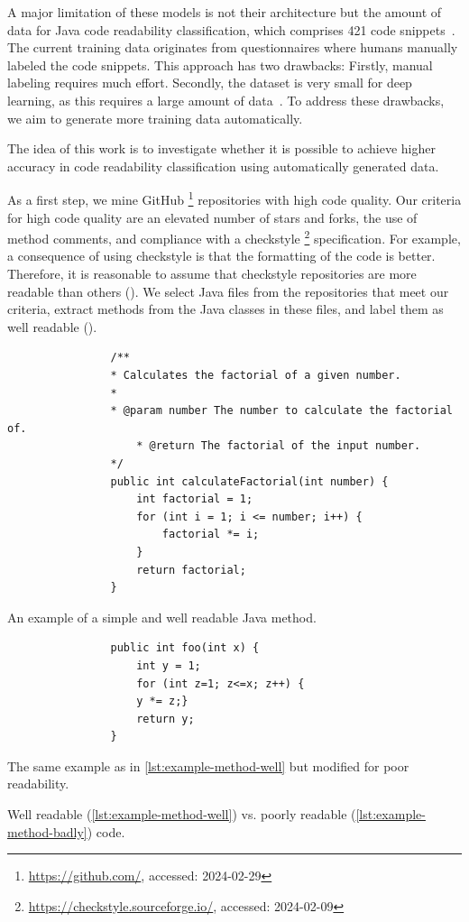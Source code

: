 \documentclass[%
class=scrreprt,
chapterprefix=false,%
open=right,%
twoside=true,%
paper=a4,%
logofile={Logo\_zentral\_farbig\_EN.png},%
thesistype=master,%
UKenglish,%
]{se2thesis}
\newcounter{urlfootnote}
\newcommand{\onecurl}[2]{%
	\stepcounter{urlfootnote}%
	\expandafter\def\csname urlfootnote:#1\endcsname{\theurlfootnote}%
	\footnote{\label{url:#1}\url{#1}, accessed: #2}%
}
\newcommand{\curl}[2]{%
		\onecurl{#1}{#2}%
}
\theoremstyle{definition}
\newcommand{\citeolddataset}{\cite{buse2009learning, dorn2012general, scalabrino2018comprehensive}\xspace}
\begin{document}
	A major limitation of these models is not their architecture but the amount of data for Java code readability classification, which comprises 421 code snippets~\citeolddataset. The current training data originates from questionnaires where humans manually labeled the code snippets. This approach has two drawbacks: Firstly, manual labeling requires much effort.
	Secondly, the dataset is very small for deep learning, as this requires a large amount of data~\cite{hestness2017deep}.
	To address these drawbacks, we aim to generate more training data automatically.
	
	The idea of this work is to investigate whether it is possible to achieve higher accuracy in code readability classification using automatically generated data. 
	
	As a first step, we mine GitHub\curl{https://github.com/}{2024-02-29} repositories with high code quality.
	Our criteria for high code quality are an elevated number of stars and forks, the use of method comments, and compliance with a checkstyle\curl{https://checkstyle.sourceforge.io/}{2024-02-09} specification. For example, a consequence of using checkstyle is that the formatting of the code is better. Therefore, it is reasonable to assume that  checkstyle repositories are more readable than others ().
	We select Java files from the repositories that meet our criteria, extract methods from the Java classes in these files, and label them as well readable ().
	
	\begin{listing}[tb]
		\begin{sublisting}{\linewidth}
			\begin{verbatim}
				/**
				* Calculates the factorial of a given number.
				*
				* @param number The number to calculate the factorial of.
					* @return The factorial of the input number.
				*/
				public int calculateFactorial(int number) {
					int factorial = 1;
					for (int i = 1; i <= number; i++) {
						factorial *= i;
					}
					return factorial;
				}
			\end{verbatim}
			\caption{An example of a simple and well readable Java method.}
			\label{lst:example-method-well}
		\end{sublisting}		
		\begin{sublisting}{\linewidth}
			\begin{verbatim}
				public int foo(int x) {
					int y = 1;
					for (int z=1; z<=x; z++) {
					y *= z;}
					return y;
				}
			\end{verbatim}
			\caption{The same example as in \autoref{lst:example-method-well} but modified for poor readability.}
			\label{lst:example-method-badly}
		\end{sublisting}
		\caption{Well readable (\autoref{lst:example-method-well}) vs. poorly readable (\autoref{lst:example-method-badly}) code.}
		\label{lst:example-method}
	\end{listing}
	
\end{document}
